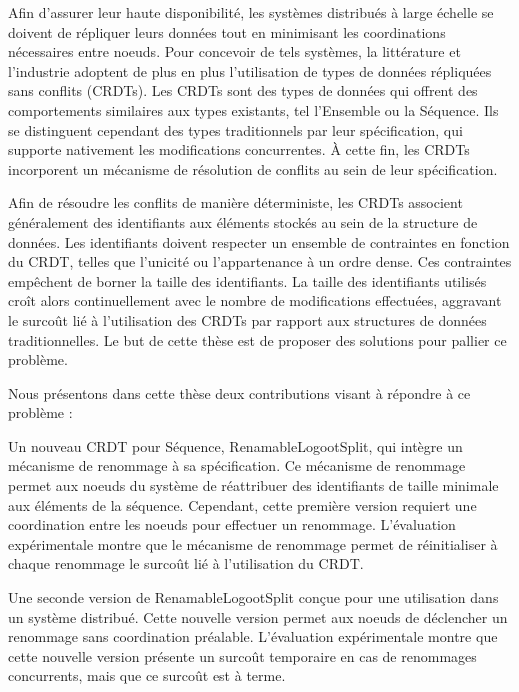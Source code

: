 \documentclass[12pt]{thesul}
\begin{document}
\NumberAbstractPages
\begin{ThesisAbstract}
  \begin{FrenchAbstract}
    Afin d'assurer leur haute disponibilité, les systèmes distribués à large échelle se doivent de répliquer leurs données tout en minimisant les coordinations nécessaires entre noeuds.
    Pour concevoir de tels systèmes, la littérature et l'industrie adoptent de plus en plus l'utilisation de types de données répliquées sans conflits (CRDTs).
    Les CRDTs sont des types de données qui offrent des comportements similaires aux types existants, tel l'Ensemble ou la Séquence.
    Ils se distinguent cependant des types traditionnels par leur spécification, qui supporte nativement les modifications concurrentes.
    À cette fin, les CRDTs incorporent un mécanisme de résolution de conflits au sein de leur spécification.

    Afin de résoudre les conflits de manière déterministe, les CRDTs associent généralement des identifiants aux éléments stockés au sein de la structure de données.
    Les identifiants doivent respecter un ensemble de contraintes en fonction du CRDT, telles que l'unicité ou l'appartenance à un ordre dense.
    Ces contraintes empêchent de borner la taille des identifiants.
    La taille des identifiants utilisés croît alors continuellement avec le nombre de modifications effectuées, aggravant le surcoût lié à l'utilisation des CRDTs par rapport aux structures de données traditionnelles.
    Le but de cette thèse est de proposer des solutions pour pallier ce problème.

    Nous présentons dans cette thèse deux contributions visant à répondre à ce problème :
    \begin{enumerate*}[label=(\roman*)]
      \item Un nouveau CRDT pour Séquence, RenamableLogootSplit, qui intègre un mécanisme de renommage à sa spécification.
      Ce mécanisme de renommage permet aux noeuds du système de réattribuer des identifiants de taille minimale aux éléments de la séquence.
      Cependant, cette première version requiert une coordination entre les noeuds pour effectuer un renommage.
      L'évaluation expérimentale montre que le mécanisme de renommage permet de réinitialiser à chaque renommage le surcoût lié à l'utilisation du CRDT.
      \item Une seconde version de RenamableLogootSplit conçue pour une utilisation dans un système distribué.
      Cette nouvelle version permet aux noeuds de déclencher un renommage sans coordination préalable.
      L'évaluation expérimentale montre que cette nouvelle version présente un surcoût temporaire en cas de renommages concurrents, mais que ce surcoût est à terme.
    \end{enumerate*}
  \end{FrenchAbstract}
  \begin{EnglishAbstract}
  \end{EnglishAbstract}
\end{ThesisAbstract}
\end{document}
